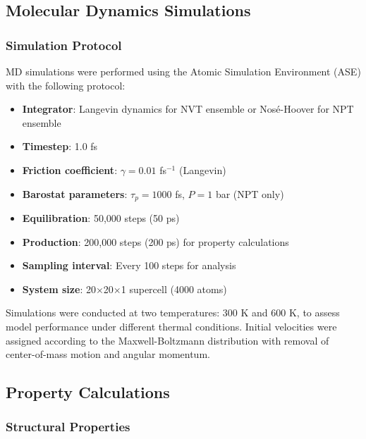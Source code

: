 \documentclass[pdflatex,sn-mathphys-num]{sn-jnl}%
\providecommand{\reviewermap}[3]{}
\theoremstyle{thmstyleone}%
\theoremstyle{thmstyletwo}%
\theoremstyle{thmstylethree}%
\begin{document}
\subsection{Molecular Dynamics Simulations}


\subsubsection{Simulation Protocol}

MD simulations were performed using the Atomic Simulation Environment (ASE) with the following protocol:

\begin{itemize}
    \item \textbf{Integrator}: Langevin dynamics for NVT ensemble or Nosé-Hoover for NPT ensemble
    \item \textbf{Timestep}: 1.0 fs
    \item \textbf{Friction coefficient}: $\gamma = 0.01$ fs$^{-1}$ (Langevin)
    \item \textbf{Barostat parameters}: $\tau_p = 1000$ fs, $P = 1$ bar (NPT only)
    \item \textbf{Equilibration}: 50,000 steps (50 ps)
    \item \textbf{Production}: 200,000 steps (200 ps) for property calculations
    \item \textbf{Sampling interval}: Every 100 steps for analysis
    \item \textbf{System size}: 20$\times$20$\times$1 supercell (4000 atoms)
\end{itemize}

\reviewermap{REV-C9}{pending-cluster}{The FT-600K transport trajectory is quarantined until the corrected long-run protocol is completed and reprocessed.}
Simulations were conducted at two temperatures: 300 K and 600 K, to assess model performance under different thermal conditions. Initial velocities were assigned according to the Maxwell-Boltzmann distribution with removal of center-of-mass motion and angular momentum.

\subsection{Property Calculations}

\subsubsection{Structural Properties}
\end{document}
